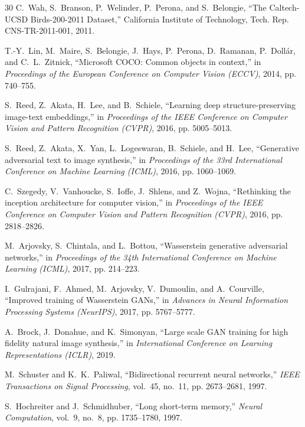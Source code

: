 \documentclass[conference]{IEEEtran}
\begin{document}
\begin{thebibliography}{30}
C.~Wah, S.~Branson, P.~Welinder, P.~Perona, and S.~Belongie, ``The Caltech-UCSD Birds-200-2011 Dataset,'' California Institute of Technology, Tech. Rep. CNS-TR-2011-001, 2011.

T.-Y.~Lin, M.~Maire, S.~Belongie, J.~Hays, P.~Perona, D.~Ramanan, P.~Doll\'{a}r, and C.~L.~Zitnick, ``Microsoft COCO: Common objects in context,'' in \textit{Proceedings of the European Conference on Computer Vision (ECCV)}, 2014, pp. 740--755.

S.~Reed, Z.~Akata, H.~Lee, and B.~Schiele, ``Learning deep structure-preserving image-text embeddings,'' in \textit{Proceedings of the IEEE Conference on Computer Vision and Pattern Recognition (CVPR)}, 2016, pp. 5005--5013.

S.~Reed, Z.~Akata, X.~Yan, L.~Logeswaran, B.~Schiele, and H.~Lee, ``Generative adversarial text to image synthesis,'' in \textit{Proceedings of the 33rd International Conference on Machine Learning (ICML)}, 2016, pp. 1060--1069.

C.~Szegedy, V.~Vanhoucke, S.~Ioffe, J.~Shlens, and Z.~Wojna, ``Rethinking the inception architecture for computer vision,'' in \textit{Proceedings of the IEEE Conference on Computer Vision and Pattern Recognition (CVPR)}, 2016, pp. 2818--2826.

M.~Arjovsky, S.~Chintala, and L.~Bottou, ``Wasserstein generative adversarial networks,'' in \textit{Proceedings of the 34th International Conference on Machine Learning (ICML)}, 2017, pp. 214--223.

I.~Gulrajani, F.~Ahmed, M.~Arjovsky, V.~Dumoulin, and A.~Courville, ``Improved training of Wasserstein GANs,'' in \textit{Advances in Neural Information Processing Systems (NeurIPS)}, 2017, pp. 5767--5777.

A.~Brock, J.~Donahue, and K.~Simonyan, ``Large scale GAN training for high fidelity natural image synthesis,'' in \textit{International Conference on Learning Representations (ICLR)}, 2019.

M.~Schuster and K.~K.~Paliwal, ``Bidirectional recurrent neural networks,'' \textit{IEEE Transactions on Signal Processing}, vol.~45, no.~11, pp. 2673--2681, 1997.

S.~Hochreiter and J.~Schmidhuber, ``Long short-term memory,'' \textit{Neural Computation}, vol.~9, no.~8, pp. 1735--1780, 1997.


\end{thebibliography}
\end{document}
